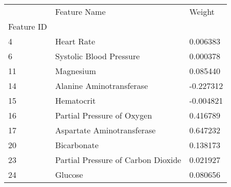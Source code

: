 \begin{tabular}{lll}
\toprule
 & Feature Name & Weight \\
Feature ID &  &  \\
\midrule
4 & Heart Rate & 0.006383 \\
6 & Systolic Blood Pressure & 0.000378 \\
11 & Magnesium & 0.085440 \\
14 & Alanine Aminotransferase & -0.227312 \\
15 & Hematocrit & -0.004821 \\
16 & Partial Pressure of Oxygen & 0.416789 \\
17 & Aspartate Aminotransferase & 0.647232 \\
20 & Bicarbonate & 0.138173 \\
23 & Partial Pressure of Carbon Dioxide & 0.021927 \\
24 & Glucose & 0.080656 \\
\bottomrule
\end{tabular}
